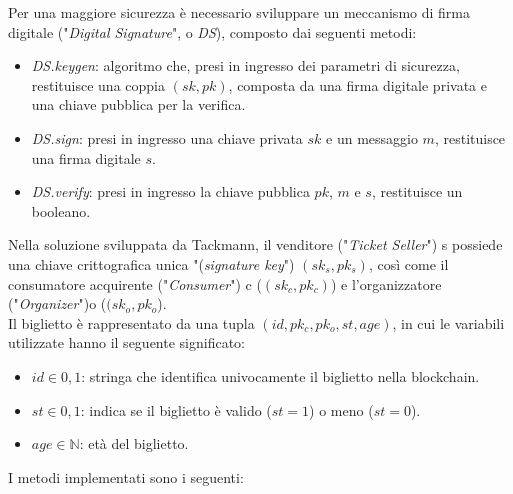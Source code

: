 Per una maggiore sicurezza è necessario sviluppare un meccanismo di firma digitale ("\emph{Digital Signature}", o \emph{DS}), composto dai seguenti metodi: 
\begin{itemize}
\item \emph{DS.keygen}: algoritmo che, presi in ingresso dei parametri di sicurezza, restituisce una coppia $ (sk, pk) $, composta da una firma digitale privata e una chiave pubblica per la verifica.  
\item \emph{DS.sign}: presi in ingresso una chiave privata $sk$ e un messaggio $m$, restituisce una firma digitale $s$.
\item \emph{DS.verify}: presi in ingresso la chiave pubblica $pk$, $m$ e $s$, restituisce un booleano. 
\end{itemize}
Nella soluzione sviluppata da Tackmann, il venditore ("\textit{Ticket Seller}") s possiede una chiave crittografica unica "(\textit{signature key}") $ (sk_{s}, pk_{s}) $, così come il consumatore acquirente ("\textit{Consumer}") c ($(sk_{c}, pk_{c})$) e l'organizzatore ("\textit{Organizer}")o ($(sk_{o}, pk_{o}$). \\
Il biglietto è rappresentato da una tupla $ (id, pk_{c}, pk_{o}, st, age) $, in cui le variabili utilizzate hanno il seguente significato: 
\begin{itemize}
\item $ id \in{0, 1} $: stringa che identifica univocamente il biglietto nella blockchain. %
\item $ st \in{0, 1} $: indica se il biglietto è valido ($ st = 1 $) o meno ($ st = 0 $).  
\item $ age \in{\mathbb{N}} $: età del biglietto. 
\end{itemize} 
I metodi implementati sono i seguenti: 
